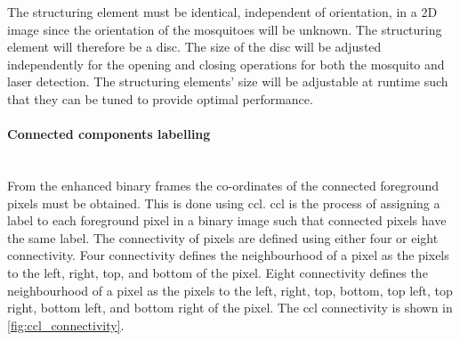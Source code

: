 The structuring element must be identical, independent of orientation, in a 2D image since the orientation of the mosquitoes will be unknown. The structuring element will therefore be a disc. The size of the disc will be adjusted independently for the opening and closing operations for both the mosquito and laser detection. The structuring elements' size will be adjustable at runtime such that they can be tuned to provide optimal performance.


\paragraph{Connected components labelling}\label{par:ccl}\mbox{}\\
From the enhanced binary frames the co-ordinates of the connected foreground pixels must be obtained. This is done using \gls{ccl}. \Gls{ccl} is the process of assigning a label to each foreground pixel in a binary image such that connected pixels have the same label. The connectivity of pixels are defined using either four or eight connectivity. Four connectivity defines the neighbourhood of a pixel as the pixels to the left, right, top, and bottom of the pixel. Eight connectivity defines the neighbourhood of a pixel as the pixels to the left, right, top, bottom, top left, top right, bottom left, and bottom right of the pixel. The \gls{ccl} connectivity is shown in \autoref{fig:ccl_connectivity}.
